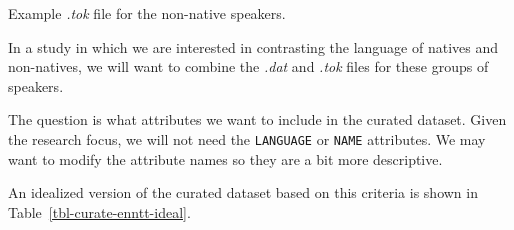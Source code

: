 \documentclass[
  letterpaper,
]{latex/krantz}
\newenvironment{Shaded}{\begin{snugshade}}{\end{snugshade}}
\newcommand{\NormalTok}[1]{\textcolor[rgb]{0.00,0.00,0.00}{#1}}
\theoremstyle{definition}
\theoremstyle{remark}
\begin{document}
\begin{codelisting}

\caption{\label{lst-curate-enntt-nonnatives-tok}Example \emph{.tok} file
for the non-native speakers.}

\centering{

\begin{Shaded}
\begin{Highlighting}[]
\NormalTok{The Commission is following with interest the planned construction of a nuclear power plant in Akkuyu , Turkey and recognises the importance of ensuring that the construction of the new plant follows the highest internationally accepted nuclear safety standards .}
\NormalTok{According to our information , the decision on the selection of a bidder has not been taken yet .}
\end{Highlighting}
\end{Shaded}

}

\end{codelisting}%

In a study in which we are interested in contrasting the language of
natives and non-natives, we will want to combine the \emph{.dat} and
\emph{.tok} files for these groups of speakers.

The question is what attributes we want to include in the curated
dataset. Given the research focus, we will not need the
\texttt{LANGUAGE} or \texttt{NAME} attributes. We may want to modify the
attribute names so they are a bit more descriptive.

An idealized version of the curated dataset based on this criteria is
shown in Table~\ref{tbl-curate-enntt-ideal}.
\end{document}

